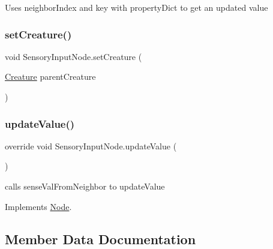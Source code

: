 Uses neighbor\+Index and key with property\+Dict to get an updated value 

\mbox{\label{class_sensory_input_node_a31e18eb14cbeb233c8097e53b9f6c896}} 
\subsubsection{\texorpdfstring{set\+Creature()}{setCreature()}}
{\footnotesize\ttfamily void Sensory\+Input\+Node.\+set\+Creature (\begin{DoxyParamCaption}\item[{\mbox{\hyperlink{class_creature}{Creature}}}]{parent\+Creature }\end{DoxyParamCaption})}

\mbox{\label{class_sensory_input_node_a3db8f13a203e1e604a3b79a20153cfa7}} 
\subsubsection{\texorpdfstring{update\+Value()}{updateValue()}}
{\footnotesize\ttfamily override void Sensory\+Input\+Node.\+update\+Value (\begin{DoxyParamCaption}{ }\end{DoxyParamCaption})\hspace{0.3cm}{\ttfamily [virtual]}}



calls sense\+Val\+From\+Neighbor to update\+Value 



Implements \mbox{\hyperlink{class_node_a85ebd0e36c25430570b94f923afd2a62}{Node}}.



\subsection{Member Data Documentation}
\mbox{\label{class_sensory_input_node_a2886b0729565781d8e27cbfe72726625}} 

